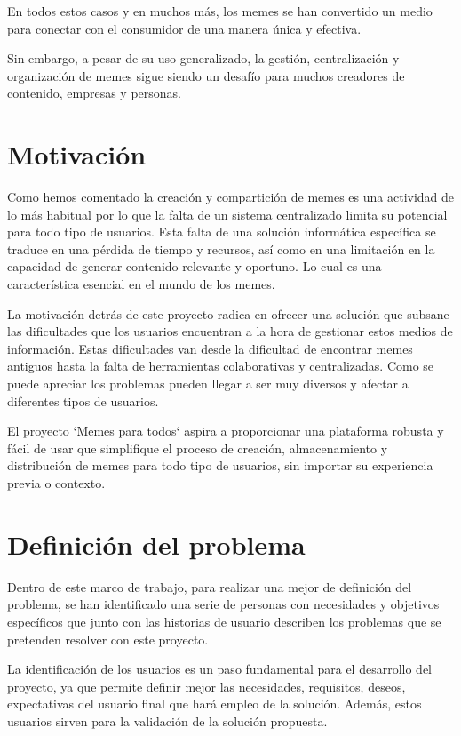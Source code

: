 En todos estos casos y en muchos más, los memes se han convertido un medio para conectar con el consumidor de una manera única y efectiva.

Sin embargo, a pesar de su uso generalizado, la gestión, centralización y organización de memes sigue siendo un desafío para muchos creadores de contenido, empresas y personas.

\section{Motivación}

Como hemos comentado la creación y compartición de memes es una actividad de lo más habitual por lo que la falta de un sistema centralizado limita su potencial para todo tipo de usuarios. Esta falta de una solución informática específica se traduce en una pérdida de tiempo y recursos, así como en una limitación en la capacidad de generar contenido relevante y oportuno. Lo cual es una característica esencial en el mundo de los memes.

La motivación detrás de este proyecto radica en ofrecer una solución que subsane las dificultades que los usuarios encuentran a la hora de gestionar estos medios de información. Estas dificultades van desde la dificultad de encontrar memes antiguos hasta la falta de herramientas colaborativas y centralizadas. Como se puede apreciar los problemas pueden llegar a ser muy diversos y afectar a diferentes tipos de usuarios.

El proyecto `Memes para todos` aspira a proporcionar una plataforma robusta y fácil de usar que simplifique el proceso de creación, almacenamiento y distribución de memes para todo tipo de usuarios, sin importar su experiencia previa o contexto.

\section{Definición del problema}

Dentro de este marco de trabajo, para realizar una mejor de definición del problema, se han identificado una serie de personas con necesidades y objetivos específicos que junto con las historias de usuario describen los problemas que se pretenden resolver con este proyecto.

La identificación de los usuarios es un paso fundamental para el desarrollo del proyecto, ya que permite definir mejor las necesidades, requisitos, deseos, expectativas del usuario final que hará empleo de la solución. Además, estos usuarios sirven para la validación de la solución propuesta.

